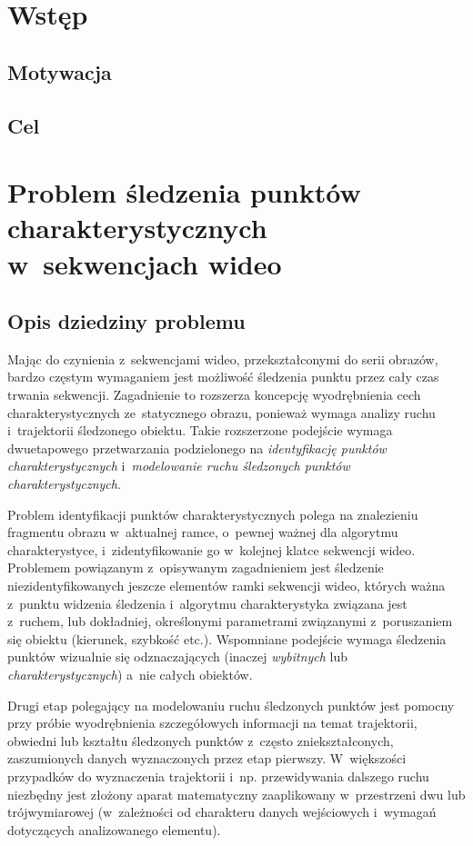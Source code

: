 \chapter{Wstęp}\label{Chapter_Wstep}

  \section{Motywacja}\label{Section_Motywacja}

  \section{Cel}\label{Section_Cel}

\chapter{Problem śledzenia punktów charakterystycznych w~sekwencjach wideo}

  \section{Opis dziedziny problemu}\label{Section_Problematyka}
    Mając do czynienia z~sekwencjami wideo, przekształconymi do serii obrazów, bardzo częstym wymaganiem jest możliwość śledzenia punktu przez cały czas trwania sekwencji. Zagadnienie to rozszerza koncepcję wyodrębnienia cech charakterystycznych ze~statycznego obrazu, ponieważ wymaga analizy ruchu i~trajektorii śledzonego obiektu. Takie rozszerzone podejście wymaga dwuetapowego przetwarzania podzielonego na \textit{identyfikację punktów charakterystycznych} i~\textit{modelowanie ruchu śledzonych punktów charakterystycznych}.

    Problem identyfikacji punktów charakterystycznych polega na znalezieniu fragmentu obrazu w~aktualnej ramce, o~pewnej ważnej dla algorytmu charakterystyce, i~zidentyfikowanie go w~kolejnej klatce sekwencji wideo. Problemem powiązanym z~opisywanym zagadnieniem jest śledzenie niezidentyfikowanych jeszcze elementów ramki sekwencji wideo, których ważna z~punktu widzenia śledzenia i~algorytmu charakterystyka związana jest z~ruchem, lub dokładniej, określonymi parametrami związanymi z~poruszaniem się obiektu (kierunek, szybkość etc.). Wspomniane podejście wymaga śledzenia punktów wizualnie się odznaczających (inaczej \textit{wybitnych} lub \textit{charakterystycznych}) a~nie całych obiektów.

    Drugi etap polegający na modelowaniu ruchu śledzonych punktów jest pomocny przy próbie wyodrębnienia szczegółowych informacji na temat trajektorii, obwiedni lub kształtu śledzonych punktów z~często zniekształconych, zaszumionych danych wyznaczonych przez etap pierwszy. W~większości przypadków do wyznaczenia trajektorii i~np. przewidywania dalszego ruchu niezbędny jest złożony aparat matematyczny zaaplikowany w~przestrzeni dwu lub trójwymiarowej (w~zależności od charakteru danych wejściowych i~wymagań dotyczących analizowanego elementu).


